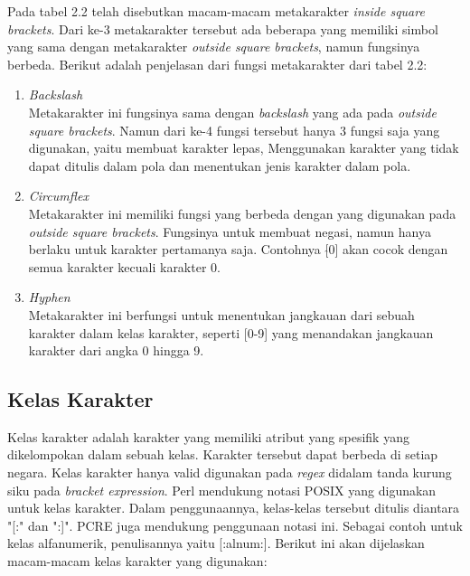 Pada tabel 2.2 telah disebutkan macam-macam metakarakter \textit{inside square brackets}. Dari ke-3 metakarakter tersebut ada beberapa yang memiliki simbol yang sama dengan metakarakter \textit{outside square brackets}, namun fungsinya berbeda. Berikut adalah penjelasan dari fungsi metakarakter dari tabel 2.2:

\begin{enumerate}
	\item \textit{Backslash} \\
	Metakarakter ini fungsinya sama dengan \textit{backslash} yang ada pada \textit{outside square brackets}. Namun dari ke-4 fungsi tersebut hanya 3 fungsi saja yang digunakan, yaitu membuat karakter lepas, Menggunakan karakter yang tidak dapat ditulis dalam pola dan menentukan jenis karakter dalam pola.
	
	\item \textit{Circumflex} \\
	Metakarakter ini memiliki fungsi yang berbeda dengan yang digunakan pada \textit{outside square brackets}. Fungsinya untuk membuat negasi, namun hanya berlaku untuk karakter pertamanya saja. Contohnya [$\hat{}$0] akan cocok dengan semua karakter kecuali karakter 0.
	
	\item \textit{Hyphen} \\
	Metakarakter ini berfungsi untuk menentukan jangkauan dari sebuah karakter dalam kelas karakter, seperti [0-9] yang menandakan jangkauan karakter dari angka 0 hingga 9.
	
\end{enumerate}
	
\subsection{Kelas Karakter}

Kelas karakter adalah karakter yang memiliki atribut yang spesifik yang dikelompokan dalam sebuah kelas. Karakter tersebut dapat berbeda di setiap negara. Kelas karakter hanya valid digunakan pada \textit{regex} didalam tanda kurung siku pada \textit{bracket expression}. Perl mendukung notasi POSIX yang digunakan untuk kelas karakter. Dalam penggunaannya, kelas-kelas tersebut ditulis diantara "[:" dan ":]". PCRE juga mendukung penggunaan notasi ini. Sebagai contoh untuk kelas alfanumerik, penulisannya yaitu [:alnum:]. Berikut ini akan dijelaskan macam-macam kelas karakter yang digunakan:

